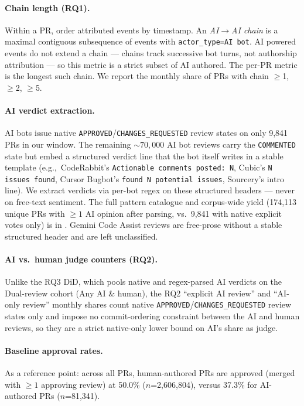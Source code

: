 \paragraph{Chain length (RQ1).} Within a PR, order attributed events by timestamp. An \emph{AI$\to$AI chain} is a maximal contiguous subsequence of events with \texttt{actor\_type=AI bot}. AI powered events do not extend a chain --- chains track successive bot turns, not authorship attribution --- so this metric is a strict subset of AI authored. The per-PR metric is the longest such chain. We report the monthly share of PRs with chain $\geq$1, $\geq$2, $\geq$5.

\paragraph{AI verdict extraction.} AI bots issue native \texttt{APPROVED}/\texttt{CHANGES\_REQUESTED} review states on only 9,841{} PRs in our window. The remaining ${\sim}70{,}000$ AI bot reviews carry the \texttt{COMMENTED} state but embed a structured verdict line that the bot itself writes in a stable template (e.g.,\ CodeRabbit's \texttt{Actionable comments posted: N}, Cubic's \texttt{N issues found}, Cursor Bugbot's \texttt{found N potential issues}, Sourcery's intro line). We extract verdicts via per-bot regex on these structured headers --- never on free-text sentiment. The full pattern catalogue and corpus-wide yield (174,113{} unique PRs with $\geq 1$ AI opinion after parsing, vs.\ 9,841{} with native explicit votes only) is in . Gemini Code Assist reviews are free-prose without a stable structured header and are left unclassified.

\paragraph{AI vs.\ human judge counters (RQ2).} Unlike the RQ3 DiD, which pools native and regex-parsed AI verdicts on the Dual-review cohort (Any AI \& human), the RQ2 ``explicit AI review'' and ``AI-only review'' monthly shares count native \texttt{APPROVED}/\texttt{CHANGES\_REQUESTED} review states only and impose no commit-ordering constraint between the AI and human reviews, so they are a strict native-only lower bound on AI's share as judge.

\paragraph{Baseline approval rates.} As a reference point: across all PRs, human-authored PRs are approved (merged with $\geq 1$ approving review) at 50.0\% ($n$=2,606,804), versus 37.3\% for AI-authored PRs ($n$=81,341).

